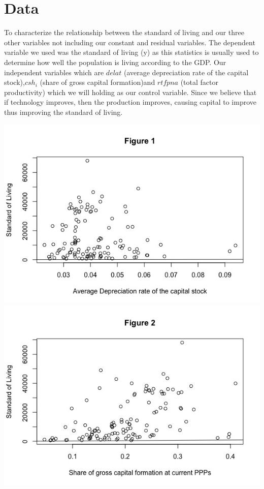 \documentclass{article}
\begin{document}
\section{Data}
To characterize the relationship between the standard of living and our three other variables not including our constant and residual variables. The dependent variable we used was the standard of living (y) as this statistics is usually used to determine how well the population is living according to the GDP. Our independent variables which are $delat$ (average depreciation rate of the capital stock),$csh_i$ (share of gross capital formation)and $rtfpna$ (total factor productivity) which we will holding as our control variable. Since we believe that if technology improves, then the production improves, causing capital to improve thus improving the standard of living.
 \begin{center}\title{}
    \includegraphics[scale=0.25]{d.jpeg}
    \includegraphics[scale=0.25]{s.jpeg}

\end{center}
\end{document}
